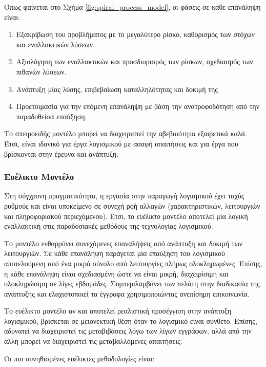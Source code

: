 Όπως φαίνεται στο Σχήμα \ref{fig:spiral_process_model}, οι φάσεις σε κάθε επανάληψη είναι:
\begin{enumerate}
    \item Εξακρίβωση του προβλήματος με το μεγαλύτερο ρίσκο, καθορισμός των στόχων και εναλλακτικών λύσεων.
    \item Αξιολόγηση των εναλλακτικών και προσδιορισμός των ρίσκων, σχεδιασμός των πιθανών λύσεων.
    \item Ανάπτυξη μίας λύσης, επιβεβαίωση καταλληλότητας και δοκιμή της
    \item Προετοιμασία για την επόμενη επανάληψη με βάση την ανατροφοδότηση από την παραδοθείσα επαύξηση.
\end{enumerate}

Το σπειροειδής μοντέλο μπορεί να διαχειριστεί την αβεβαιότητα εξαιρετικά καλά. Έτσι, είναι ιδανικό για έργα λογισμικού με ασαφή απαιτήσεις και για έργα που βρίσκονται στην έρευνα και ανάπτυξη.

\subsubsection{Ευέλικτο Μοντέλο}
Στη σύγχρονη πραγματικότητα, η εργασία στην παραγωγή λογισμικού έχει ταχύς ρυθμούς και είναι υποκείμενο σε συνεχή ροή αλλαγών (χαρακτηριστικών, λειτουργιών και πληροφοριακού περιεχόμενου). Έτσι, το \textsl{ευέλικτο} μοντέλο αποτελεί μία λογική εναλλακτική στις παραδοσιακές μεθόδους της τεχνολογίας λογισμικού. 

Το μοντέλο ενθαρρύνει συνεχόμενες επαναλήψεις από ανάπτυξη και δοκιμή των λειτουργιών. Σε κάθε επανάληψη παράγεται μία επαύξηση του λογισμικού αποτελούμενη από ένα μικρό σύνολο από λειτουργίες πλήρως ολοκληρωμένες. Επίσης, η κάθε επανάληψη είναι σχεδιασμένη ώστε να είναι μικρή, διαχειρίσιμη και ολοκληρώσιμη σε λίγες εβδομάδες. Συμπεριλαμβάνει των πελάτη στην διαδικασία της ανάπτυξης και ελαχιστοποιεί τα έγγραφα χρησιμοποιώντας ανεπίσημη επικοινωνία.

Το ευέλικτο μοντέλο αν και αποτελεί ρεαλιστική προσέγγιση στην ανάπτυξη λογισμικού, βρίσκεται σε μειονεκτική θέση όταν το λογισμικό είναι σύνθετο. Επίσης, αδυνατεί να διαχειριστεί τις μεταβιβάσεις λόγω των λίγων εγγράφων, αλλά από την άλλη μπορεί να διαχειριστεί τις μεταβαλλόμενες απαιτήσεις.

Οι πιο συνηθισμένες ευέλικτες μεθοδολογίες είναι:

